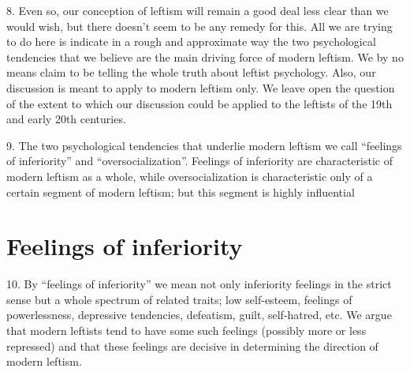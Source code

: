 \documentclass{article}
\begin{document}
8.  Even so, our conception of leftism will remain a good deal less clear than we would wish, but 
there doesn’t seem to be any remedy for this.  All we are trying to do here is indicate in a rough 
and approximate way the two psychological tendencies that we believe are the main driving force 
of modern leftism.  We by no means claim to be telling the whole truth about leftist 
psychology.  Also, our discussion is meant to apply to modern leftism only.  We leave open the 
question of the extent to which our discussion could be applied to the leftists of the 19th and early 
20th centuries. \vspace{\baselineskip}

9.  The two psychological tendencies that underlie modern leftism we call “feelings of inferiority” 
and  “oversocialization”.  Feelings  of  inferiority  are  characteristic  of  modern  leftism  as  a  whole,  
while  oversocialization  is  characteristic  only  of  a  certain  segment  of  modern  leftism;  but  this  
segment is highly influential

\section{Feelings of inferiority}


\hspace{0.5cm} 10. By “feelings of inferiority” we mean not only inferiority feelings in the strict sense but a whole 
spectrum  of  related  traits;  low  self-esteem,  feelings  of  powerlessness,  depressive  tendencies,  
defeatism, guilt, self-hatred, etc.  We argue that modern leftists tend to have some such feelings 
(possibly more or less repressed) and that these feelings are decisive in determining the direction 
of modern leftism. \vspace{\baselineskip}
\end{document}
